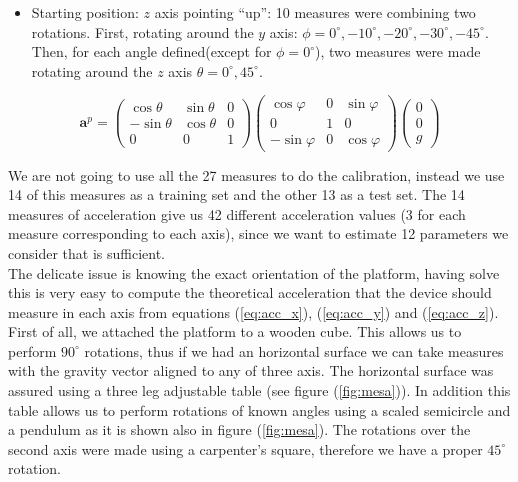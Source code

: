 \documentclass[conference]{IEEEtran}
\newcommand{\refp}[1]{(\ref{#1})}
\begin{document}
\begin{itemize}
\item Starting position: $z$ axis pointing ``up'': 10 measures were combining two rotations. First, rotating around the $y$ axis: $\phi =0^\circ, -10^\circ, -20^\circ, -30^\circ, -45^\circ$. Then, for each angle defined(except for $\phi = 0^\circ$), two measures were made rotating around the $z$ axis $\theta = 0^\circ, 45^\circ$.   \end{itemize}

\begin{scriptsize}
\begin{equation}
\mathbf{a}^p = \left(\begin{array}{ccc}
\cos \theta & \sin \theta & 0\\
-\sin \theta & \cos \theta & 0\\
0 & 0 & 1
\end{array}\right)\left(\begin{array}{ccc}
\cos \varphi & 0 &\sin \varphi\\
0 & 1 & 0\\
-\sin \varphi & 0 & \cos \varphi
\end{array}\right)\left(\begin{array}{c}
0\\
0\\
g
\end{array}\right)
\label{eq:acc_z}
\end{equation}
\end{scriptsize}

We are not going to use all the 27 measures to do the calibration, instead we use 14 of this measures as a training set and the other 13 as a test set. The 14 measures of acceleration give us 42 different acceleration values (3 for each measure corresponding to each axis), since we want to estimate 12 parameters we consider that is sufficient.\\

The delicate issue is knowing the exact orientation of the platform, having solve this is very easy to compute the theoretical acceleration that the device should measure in each axis from equations \refp{eq:acc_x}, \refp{eq:acc_y} and \refp{eq:acc_z}.\\

First of all, we attached the platform to a wooden cube. This allows us to perform $90^\circ$ rotations, thus if we had an horizontal surface we can take measures with the gravity vector aligned to any of three axis. The horizontal surface was assured using a three leg adjustable table (see figure \refp{fig:mesa}). In addition this table allows us to perform rotations of known angles using a scaled semicircle and a pendulum as it is shown also in figure \refp{fig:mesa}. The rotations over the second axis were made using a carpenter's square, therefore we have a proper $45^\circ$ rotation.\\
\end{document}
